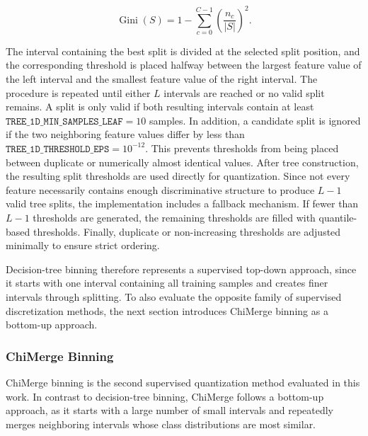             \begin{equation}
                \operatorname{Gini}(S)
                =
                1 -
                \sum_{c=0}^{C-1}
                \left(
                    \frac{n_c}{|S|}
                \right)^2 .
            \label{eq:gini_impurity}
            \end{equation}
            
        The interval containing the best split is divided at the selected split position, and the corresponding threshold is placed halfway between the largest feature value of the left interval and the smallest feature value of the right interval. The procedure is repeated until either $L$ intervals are reached or no valid split remains. A split is only valid if both resulting intervals contain at least $\texttt{TREE\_1D\_MIN\_SAMPLES\_LEAF}=10$ samples. In addition, a candidate split is ignored if the two neighboring feature values differ by less than $\texttt{TREE\_1D\_THRESHOLD\_EPS}=10^{-12}$. This prevents thresholds from being placed between duplicate or numerically almost identical values. After tree construction, the resulting split thresholds are used directly for quantization.
        Since not every feature necessarily contains enough discriminative structure to produce \(L-1\) valid tree splits, the implementation includes a fallback mechanism. If fewer than $L-1$ thresholds are generated, the remaining thresholds are filled with quantile-based thresholds. Finally, duplicate or non-increasing thresholds are adjusted minimally to ensure strict ordering.

        Decision-tree binning therefore represents a supervised top-down approach, since it starts with one interval containing all training samples and creates finer intervals through splitting. To also evaluate the opposite family of supervised discretization methods, the next section introduces ChiMerge binning as a bottom-up approach.

        \subsubsection{ChiMerge Binning}
        \label{sec:ChiBinning}
            ChiMerge binning is the second supervised quantization method evaluated in this work. In contrast to decision-tree binning, ChiMerge follows a bottom-up approach, as it starts with a large number of small intervals and repeatedly merges neighboring intervals whose class distributions are most similar. 

